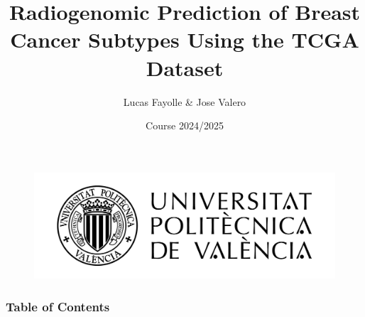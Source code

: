 \documentclass[11pt]{beamer}
\title[Project 4]{Radiogenomic Prediction of Breast Cancer Subtypes Using the TCGA Dataset}
\author[Biomedical Data Science]{\normalsize Lucas Fayolle \& Jose Valero}
\institute[BDS]{Biomedical Data Science \\ (ETSINF - UPV)}
\date[2024/2025]{Course 2024/2025}
\begin{document}

\begin{frame}
	\begin{figure}
		\includegraphics[width=0.45\linewidth]{img/upv_logo.png}
	\end{figure}
	\titlepage
\end{frame}


\begin{frame}
	\frametitle{Table of Contents}
	\tableofcontents 
\end{frame}








\end{document}
